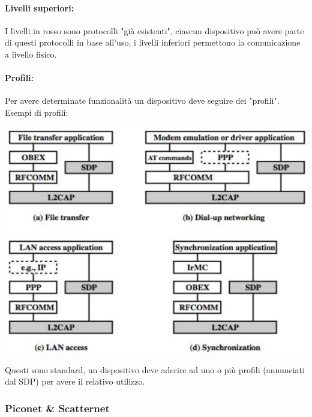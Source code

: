 \paragraph{Livelli superiori:} I livelli in rosso sono protocolli "già esistenti", ciascun dispositivo può avere parte di questi protocolli in base all'uso, i livelli inferiori permettono la comunicazione a livello fisico.\\

\newpage

\paragraph{Profili:} Per avere determinate funzionalità un dispositivo deve seguire dei "profili". Esempi di profili:
\begin{center}
	\includegraphics[width=0.7\linewidth]{img/wpan/profiles}
\end{center}
Questi sono standard, un dispositivo deve aderire ad uno o più profili (annunciati dal SDP) per avere il relativo utilizzo.\\

\newpage

\subsubsection{Piconet \& Scatternet}

